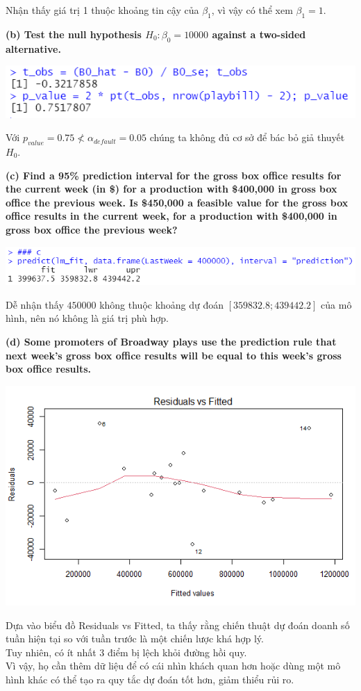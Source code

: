 \documentclass[a4paper]{article}
\theoremstyle{nonumberplain}
\begin{document}
Nhận thấy giá trị 1 thuộc khoảng tin cậy của $\beta_1$, vì vậy có thể xem $\beta_1 = 1$.

\textbf{(b) Test the null hypothesis $H_0: \beta_0 = 10000$ against a two-sided alternative.}
\begin{center}
\includegraphics[scale = 0.8]{1b.PNG} 
\end{center}
Với $p_{value} = 0.75 \nless \alpha_{default}=0.05 $ chúng ta không đủ cơ sở để bác bỏ giả thuyết $H_0$.

\textbf{(c) Find a 95\% prediction interval for the gross box office results for the current week (in \$) for a production with \$400,000 in gross
box office the previous week. Is \$450,000 a feasible value for the gross box
office results in the current week, for a production with \$400,000 in gross
box office the previous week? }
\begin{center}
\includegraphics[scale = 0.8]{1c.PNG} 
\end{center}
Dễ nhận thấy $450000$ không thuộc khoảng dự đoán $[359832.8; 439442.2]$ của mô hình, nên nó không là giá trị phù hợp.

\textbf{(d) Some promoters of Broadway plays use the prediction rule that next week’s gross box office results will be equal to this week’s gross box office results.}
\begin{center}
\includegraphics[scale = 0.8]{1d.PNG} 
\end{center}
Dựa vào biểu đồ Residuals vs Fitted, ta thấy rằng chiến thuật dự đoán doanh số tuần hiện tại so với tuần trước là một chiến lược khá hợp lý. \\
Tuy nhiên, có ít nhất 3 điểm bị lệch khỏi đường hồi quy.\\
Vì vậy, họ cần thêm dữ liệu để có cái nhìn khách quan hơn hoặc dùng một mô hình khác có thể tạo ra quy tắc dự đoán tốt hơn, giảm thiểu rủi ro.
\end{document}
